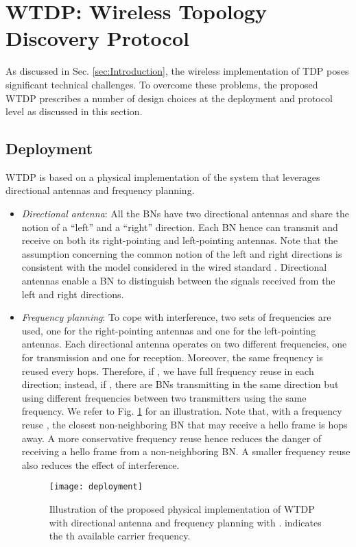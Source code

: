 \documentclass[10pt,english,two column]{IEEEtran}
\begin{document}
\section{WTDP: Wireless Topology Discovery Protocol\label{sec:Proposed-Inauguration-Scheme}}

As discussed in Sec. \ref{sec:Introduction}, the wireless implementation
of TDP poses significant technical challenges. To overcome these problems,
the proposed WTDP prescribes a number of design choices at the deployment
and protocol level as discussed in this section. 


\subsection{Deployment\label{sub:Deployment}}

WTDP is based on a physical implementation of the system that leverages
directional antennas and frequency planning.
\begin{itemize}
\item \textit{Directional antenna}: All the BNs have two directional antennas
and share the notion of a ``left'' and a ``right'' direction.
Each BN hence can transmit and receive on both its right-pointing
and left-pointing antennas. Note that the assumption concerning the
common notion of the left and right directions is consistent with
the model considered in the wired standard \cite{IEC 61375}. Directional
antennas enable a BN to distinguish between the signals received from
the left and right directions. 
\item \textit{Frequency planning}: To cope with interference, two sets of
frequencies are used, one for the right-pointing antennas and one
for the left-pointing antennas. Each directional antenna operates
on two different frequencies, one for transmission and one for reception.
Moreover, the same frequency is reused every  hops. Therefore,
if , we have full frequency reuse in each direction; instead,
if , there are  BNs transmitting in the same direction
but using different frequencies between two transmitters using the
same frequency. We refer to Fig. \ref{fig:Deployment} for an illustration.
Note that, with a frequency reuse , the closest non-neighboring
BN that may receive a hello frame is  hops away. A more conservative
frequency reuse hence reduces the danger of receiving a hello frame
from a non-neighboring BN. A smaller frequency reuse also reduces
the effect of interference.
\begin{figure}[htbp]
\begin{centering}
\textsf{\texttt{[image: deployment]}}
\par\end{centering}

\caption{\label{fig:Deployment}Illustration of the proposed physical implementation
of WTDP with directional antenna and frequency planning with .
 indicates the th available carrier frequency.}
\end{figure}

\end{itemize}
\end{document}
